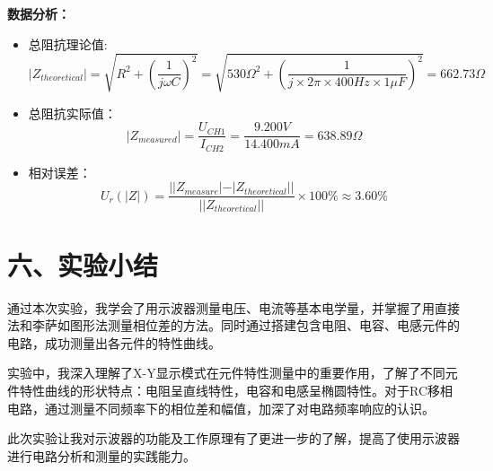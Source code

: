 \documentclass[12pt,a4paper]{article}
\begin{document}
\textbf{数据分析：}
\begin{itemize}[label={}]
    \item 总阻抗理论值:
     $$|Z_{theoretical}| = \sqrt{R^2 + ({\frac{1}{j \omega C}})^2} =\sqrt{{530\Omega}^2+ ({\frac{1}{j \times 2\pi \times 400Hz \times 1\mu F}})^2  } =  662.73\Omega$$
    \item 总阻抗实际值：
    $$|Z_{measured}| = \frac{U_{CH1}}{I_{CH2}} =\frac{9.200V}{14.400mA} = 638.89\Omega$$ 
    \item 相对误差：
    $$U_r(|Z|) = \frac{||Z_{measure}| - |Z_{theoretical}||}{||Z_{theoretical}||} \times 100\% \approx 3.60\%$$
\end{itemize}



\section*{六、实验小结}
通过本次实验，我学会了用示波器测量电压、电流等基本电学量，并掌握了用直接法和李萨如图形法测量相位差的方法。同时通过搭建包含电阻、电容、电感元件的电路，成功测量出各元件的特性曲线。

实验中，我深入理解了X-Y显示模式在元件特性测量中的重要作用，了解了不同元件特性曲线的形状特点：电阻呈直线特性，电容和电感呈椭圆特性。对于RC移相电路，通过测量不同频率下的相位差和幅值，加深了对电路频率响应的认识。

此次实验让我对示波器的功能及工作原理有了更进一步的了解，提高了使用示波器进行电路分析和测量的实践能力。
\end{document}
